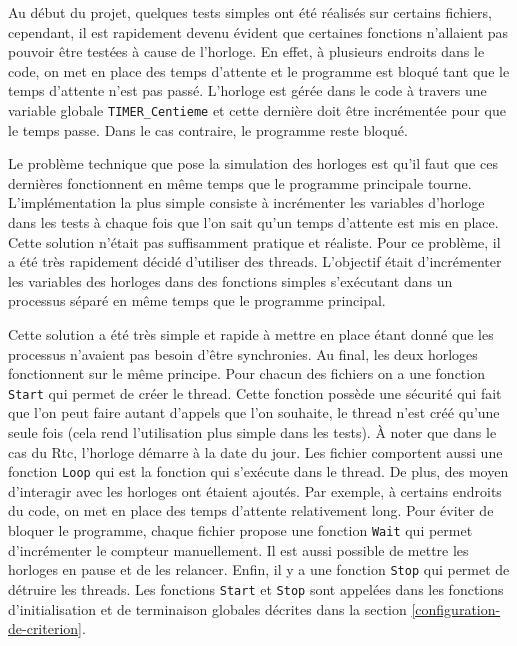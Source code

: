 \documentclass[a4paper]{article}
\begin{document}
Au début du projet, quelques tests simples ont été réalisés sur certains
fichiers, cependant, il est rapidement devenu évident que certaines fonctions
n'allaient pas pouvoir être testées à cause de l'horloge. En effet, à plusieurs
endroits dans le code, on met en place des temps d'attente et le programme est
bloqué tant que le temps d'attente n'est pas passé. L'horloge est gérée dans le
code à travers une variable globale \verb|TIMER_Centieme| et cette dernière
doit être incrémentée pour que le temps passe. Dans le cas contraire, le
programme reste bloqué.

Le problème technique que pose la simulation des horloges est qu'il faut que ces
dernières fonctionnent en même temps que le programme principale tourne.
L'implémentation la plus simple consiste à incrémenter les variables d'horloge
dans les tests à chaque fois que l'on sait qu'un temps d'attente est mis en
place. Cette solution n'était pas suffisamment pratique et réaliste. Pour ce
problème, il a été très rapidement décidé d'utiliser des threads. L'objectif
était d'incrémenter les variables des horloges dans des fonctions simples
s'exécutant dans un processus séparé en même temps que le programme principal.

Cette solution a été très simple et rapide à mettre en place étant donné que les
processus n'avaient pas besoin d'être synchronies. Au final, les deux horloges
fonctionnent sur le même principe. Pour chacun des fichiers on a une fonction
\verb|Start| qui permet de créer le thread. Cette fonction possède une
sécurité qui fait que l'on peut faire autant d'appels que l'on souhaite, le
thread n'est créé qu'une seule fois (cela rend l'utilisation plus simple dans
les tests). À noter que dans le cas du Rtc, l'horloge démarre à la date du jour.
Les fichier comportent aussi une fonction \verb|Loop| qui est la fonction
qui s'exécute dans le thread. De plus, des moyen d'interagir avec les horloges
ont étaient ajoutés. Par exemple, à certains endroits du code, on met en place
des temps d'attente relativement long. Pour éviter de bloquer le programme,
chaque fichier propose une fonction \verb|Wait| qui permet d'incrémenter le
compteur manuellement. Il est aussi possible de mettre les horloges en pause et
de les relancer. Enfin, il y a une fonction \verb|Stop| qui permet de
détruire les threads. Les fonctions \verb|Start| et \verb|Stop| sont
appelées dans les fonctions d'initialisation et de terminaison globales décrites
dans la section \ref{configuration-de-criterion}.\\
\end{document}
